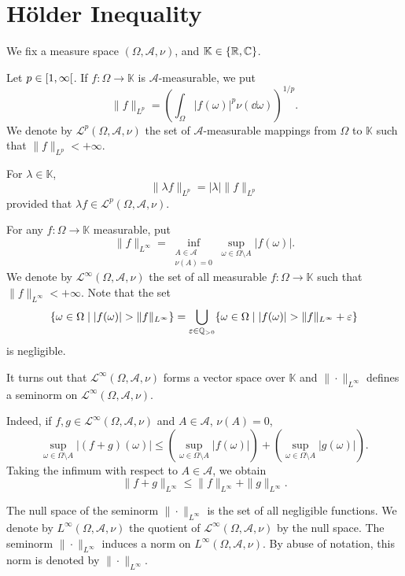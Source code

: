 \section{Hölder Inequality}
We fix a measure space $(\Omega,\mathscr{A},\nu)$, and $\mathbb{K} \in \{\mathbb{R},\mathbb{C}\}$.

\begin{definitionenv}
    Let $p \in \interval[open right]{1}{\infty}$.
    If $f : \Omega \longrightarrow \mathbb{K}$ is $\mathscr{A}$-measurable, we put
    $$\|f\|_{L^{p}} = \left(\int_{\Omega} |f(\omega)|^p \nu(\dd \omega)\right)^{1/p}.$$
    We denote by $\mathcal{L}^{p}(\Omega,\mathscr{A},\nu)$ the set of $\mathscr{A}$-measurable mappings from $\Omega$ to $\mathbb{K}$ such that $\|f\|_{L^{p}} < + \infty$.

    \quad For $\lambda \in \mathbb{K}$,
    $$\|\lambda f\|_{L^{p}} = |\lambda| \|f\|_{L^{p}}$$
    provided that $\lambda f \in \mathcal{L}^{p}(\Omega,\mathscr{A},\nu)$.
\end{definitionenv}

\begin{definitionenv}
    For any $f : \Omega \longrightarrow \mathbb{K}$ measurable, put
    $$\|f\|_{L^{\infty}} = \inf_{\substack{A \in \mathscr{A}\\\nu(A) = 0}}\sup_{\omega \in \Omega \setminus A} |f(\omega)|.$$
    We denote by $\mathcal{L}^{\infty}(\Omega,\mathscr{A},\nu)$ the set of all measurable $f : \Omega \longrightarrow \mathbb{K}$ such that $\|f\|_{L^{\infty}} < +\infty$.
    Note that the set
    $$\{\omega \in \Omega \mid |f(\omega)| > \|f\|_{L^{\infty}}\} = \bigcup_{\varepsilon \in \mathbb{Q}_{>0}}\{\omega \in \Omega \mid |f(\omega)| > \|f\|_{L^{\infty}} + \varepsilon\}$$
    is negligible.

    \quad It turns out that $\mathcal{L}^{\infty}(\Omega,\mathscr{A},\nu)$ forms a vector space over $\mathbb{K}$ and $\|\cdot\|_{L^{\infty}}$ defines a seminorm on $\mathcal{L}^{\infty}(\Omega,\mathscr{A},\nu).$

    \quad Indeed, if $f,g \in \mathcal{L}^{\infty}(\Omega,\mathscr{A},\nu)$ and $A \in \mathscr{A}$, $\nu(A) = 0$,
    $$\sup_{\omega \in \Omega\setminus A} |(f + g)(\omega)| \le (\sup_{\omega \in \Omega \setminus A}|f(\omega)|) + (\sup_{\omega \in \Omega \setminus A}|g(\omega)|).$$
    Taking the infimum with respect to $A \in \mathscr{A}$, we obtain
    $$\|f + g\|_{L^{\infty}} \le \|f\|_{L^{\infty}} + \|g\|_{L^{\infty}}.$$

    \quad The null space of the seminorm $\|\cdot\|_{L^{\infty}}$ is the set of all negligible functions.
    We denote by $L^{\infty}(\Omega,\mathscr{A},\nu)$ the quotient of $\mathcal{L}^{\infty}(\Omega,\mathscr{A},\nu)$ by the null space.
    The seminorm $\|\cdot\|_{L^{\infty}}$ induces a norm on $L^{\infty}(\Omega,\mathscr{A},\nu)$.
    By abuse of notation, this norm is denoted by $\|\cdot\|_{L^{\infty}}$.
\end{definitionenv}

